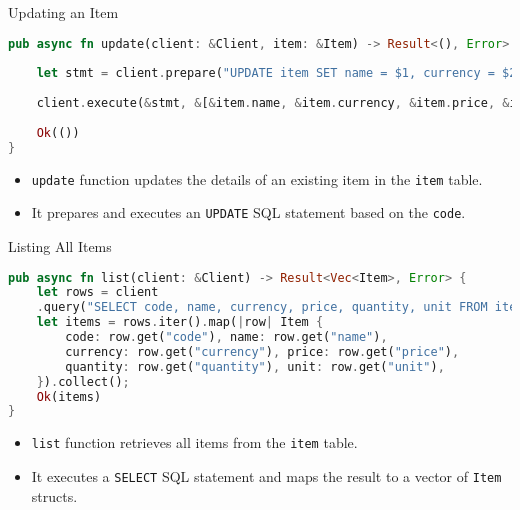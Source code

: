 \documentclass[aspectratio=169, table]{beamer}
\begin{document}
\begin{frame}[fragile]{Updating an Item}
\vspace{15pt}
\begin{lstlisting}[language=Rust]
pub async fn update(client: &Client, item: &Item) -> Result<(), Error> {
	
	let stmt = client.prepare("UPDATE item SET name = $1, currency = $2, price = $3, quantity = $4, unit = $5 WHERE code = $6",).await?;
	
	client.execute(&stmt, &[&item.name, &item.currency, &item.price, &item.quantity, &item.unit, &item.code,],).await?;
	
	Ok(())
}
\end{lstlisting}

\begin{itemize}
\item \texttt{update} function updates the details of an existing item in the \texttt{item} table.
\item It prepares and executes an \texttt{UPDATE} SQL statement based on the \texttt{code}.
\end{itemize}
\end{frame}

\begin{frame}[fragile]{Listing All Items}
\vspace{15pt}
\begin{lstlisting}[language=Rust]
pub async fn list(client: &Client) -> Result<Vec<Item>, Error> {
	let rows = client
	.query("SELECT code, name, currency, price, quantity, unit FROM item ORDER BY code",&[],).await?;	
	let items = rows.iter().map(|row| Item {
		code: row.get("code"), name: row.get("name"),
		currency: row.get("currency"), price: row.get("price"),
		quantity: row.get("quantity"), unit: row.get("unit"),
	}).collect();
	Ok(items)
}
\end{lstlisting}

\begin{itemize}
\item \texttt{list} function retrieves all items from the \texttt{item} table.
\item It executes a \texttt{SELECT} SQL statement and maps the result to a vector of \texttt{Item} structs.
\end{itemize}
\end{frame}
\end{document}
